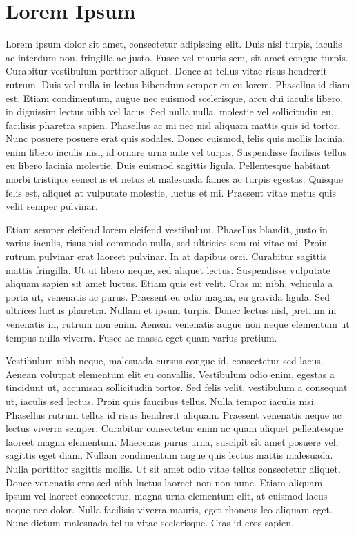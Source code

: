 \chapter{Lorem Ipsum}
\label{app:lorem_ipsum}

Lorem ipsum dolor sit amet, consectetur adipiscing elit. Duis nisl turpis, iaculis ac interdum non, fringilla ac justo. Fusce vel mauris sem, sit amet congue turpis. Curabitur vestibulum porttitor aliquet. Donec at tellus vitae risus hendrerit rutrum. Duis vel nulla in lectus bibendum semper eu eu lorem. Phasellus id diam est. Etiam condimentum, augue nec euismod scelerisque, arcu dui iaculis libero, in dignissim lectus nibh vel lacus. Sed nulla nulla, molestie vel sollicitudin eu, facilisis pharetra sapien. Phasellus ac mi nec nisl aliquam mattis quis id tortor. Nunc posuere posuere erat quis sodales. Donec euismod, felis quis mollis lacinia, enim libero iaculis nisi, id ornare urna ante vel turpis. Suspendisse facilisis tellus eu libero lacinia molestie. Duis euismod sagittis ligula. Pellentesque habitant morbi tristique senectus et netus et malesuada fames ac turpis egestas. Quisque felis est, aliquet at vulputate molestie, luctus et mi. Praesent vitae metus quis velit semper pulvinar.

Etiam semper eleifend lorem eleifend vestibulum. Phasellus blandit, justo in varius iaculis, risus nisl commodo nulla, sed ultricies sem mi vitae mi. Proin rutrum pulvinar erat laoreet pulvinar. In at dapibus orci. Curabitur sagittis mattis fringilla. Ut ut libero neque, sed aliquet lectus. Suspendisse vulputate aliquam sapien sit amet luctus. Etiam quis est velit. Cras mi nibh, vehicula a porta ut, venenatis ac purus. Praesent eu odio magna, eu gravida ligula. Sed ultrices luctus pharetra. Nullam et ipsum turpis. Donec lectus nisl, pretium in venenatis in, rutrum non enim. Aenean venenatis augue non neque elementum ut tempus nulla viverra. Fusce ac massa eget quam varius pretium.

Vestibulum nibh neque, malesuada cursus congue id, consectetur sed lacus. Aenean volutpat elementum elit eu convallis. Vestibulum odio enim, egestas a tincidunt ut, accumsan sollicitudin tortor. Sed felis velit, vestibulum a consequat ut, iaculis sed lectus. Proin quis faucibus tellus. Nulla tempor iaculis nisi. Phasellus rutrum tellus id risus hendrerit aliquam. Praesent venenatis neque ac lectus viverra semper. Curabitur consectetur enim ac quam aliquet pellentesque laoreet magna elementum. Maecenas purus urna, suscipit sit amet posuere vel, sagittis eget diam. Nullam condimentum augue quis lectus mattis malesuada. Nulla porttitor sagittis mollis. Ut sit amet odio vitae tellus consectetur aliquet. Donec venenatis eros sed nibh luctus laoreet non non nunc. Etiam aliquam, ipsum vel laoreet consectetur, magna urna elementum elit, at euismod lacus neque nec dolor. Nulla facilisis viverra mauris, eget rhoncus leo aliquam eget. Nunc dictum malesuada tellus vitae scelerisque. Cras id eros sapien.

